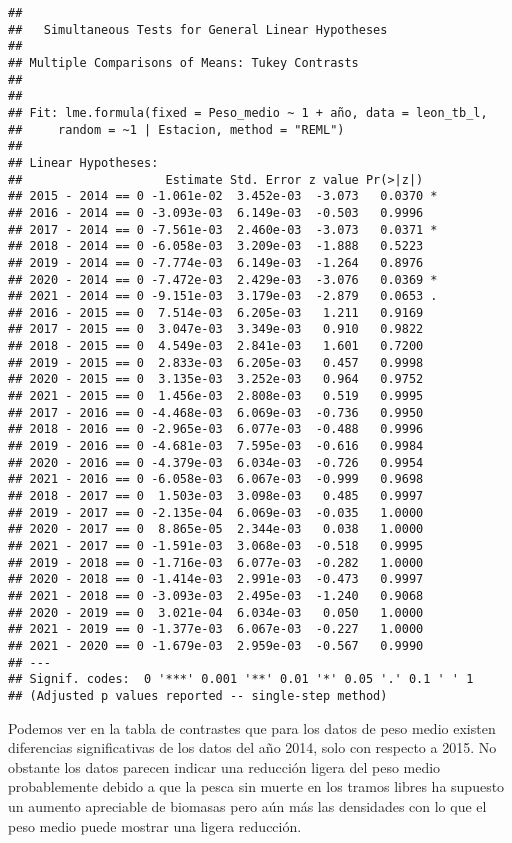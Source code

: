 \documentclass[
]{article}
\begin{document}
\begin{verbatim}
## 
##   Simultaneous Tests for General Linear Hypotheses
## 
## Multiple Comparisons of Means: Tukey Contrasts
## 
## 
## Fit: lme.formula(fixed = Peso_medio ~ 1 + año, data = leon_tb_l, 
##     random = ~1 | Estacion, method = "REML")
## 
## Linear Hypotheses:
##                    Estimate Std. Error z value Pr(>|z|)  
## 2015 - 2014 == 0 -1.061e-02  3.452e-03  -3.073   0.0370 *
## 2016 - 2014 == 0 -3.093e-03  6.149e-03  -0.503   0.9996  
## 2017 - 2014 == 0 -7.561e-03  2.460e-03  -3.073   0.0371 *
## 2018 - 2014 == 0 -6.058e-03  3.209e-03  -1.888   0.5223  
## 2019 - 2014 == 0 -7.774e-03  6.149e-03  -1.264   0.8976  
## 2020 - 2014 == 0 -7.472e-03  2.429e-03  -3.076   0.0369 *
## 2021 - 2014 == 0 -9.151e-03  3.179e-03  -2.879   0.0653 .
## 2016 - 2015 == 0  7.514e-03  6.205e-03   1.211   0.9169  
## 2017 - 2015 == 0  3.047e-03  3.349e-03   0.910   0.9822  
## 2018 - 2015 == 0  4.549e-03  2.841e-03   1.601   0.7200  
## 2019 - 2015 == 0  2.833e-03  6.205e-03   0.457   0.9998  
## 2020 - 2015 == 0  3.135e-03  3.252e-03   0.964   0.9752  
## 2021 - 2015 == 0  1.456e-03  2.808e-03   0.519   0.9995  
## 2017 - 2016 == 0 -4.468e-03  6.069e-03  -0.736   0.9950  
## 2018 - 2016 == 0 -2.965e-03  6.077e-03  -0.488   0.9996  
## 2019 - 2016 == 0 -4.681e-03  7.595e-03  -0.616   0.9984  
## 2020 - 2016 == 0 -4.379e-03  6.034e-03  -0.726   0.9954  
## 2021 - 2016 == 0 -6.058e-03  6.067e-03  -0.999   0.9698  
## 2018 - 2017 == 0  1.503e-03  3.098e-03   0.485   0.9997  
## 2019 - 2017 == 0 -2.135e-04  6.069e-03  -0.035   1.0000  
## 2020 - 2017 == 0  8.865e-05  2.344e-03   0.038   1.0000  
## 2021 - 2017 == 0 -1.591e-03  3.068e-03  -0.518   0.9995  
## 2019 - 2018 == 0 -1.716e-03  6.077e-03  -0.282   1.0000  
## 2020 - 2018 == 0 -1.414e-03  2.991e-03  -0.473   0.9997  
## 2021 - 2018 == 0 -3.093e-03  2.495e-03  -1.240   0.9068  
## 2020 - 2019 == 0  3.021e-04  6.034e-03   0.050   1.0000  
## 2021 - 2019 == 0 -1.377e-03  6.067e-03  -0.227   1.0000  
## 2021 - 2020 == 0 -1.679e-03  2.959e-03  -0.567   0.9990  
## ---
## Signif. codes:  0 '***' 0.001 '**' 0.01 '*' 0.05 '.' 0.1 ' ' 1
## (Adjusted p values reported -- single-step method)
\end{verbatim}

Podemos ver en la tabla de contrastes que para los datos de peso medio
existen diferencias significativas de los datos del año 2014, solo con
respecto a 2015. No obstante los datos parecen indicar una reducción
ligera del peso medio probablemente debido a que la pesca sin muerte en
los tramos libres ha supuesto un aumento apreciable de biomasas pero aún
más las densidades con lo que el peso medio puede mostrar una ligera
reducción.
\end{document}
